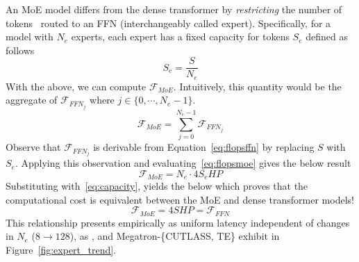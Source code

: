 An MoE model differs from the dense transformer by \emph{restricting} the number of
tokens~\cite{DBLP:conf/iclr/LepikhinLXCFHKS21, MLSYS2023_5a54f793} routed to an FFN
(interchangeably called expert).
Specifically, for a model with $N_e$ experts, each expert has a fixed capacity for tokens $S_e$ defined as follows
\begin{equation}\label{eq:capacity}
S_e = \frac{S}{N_e}
\end{equation}
With the above, we can compute $\mathcal{F}_{MoE}$.
Intuitively, this quantity would be the aggregate of $\mathcal{F}_{{FFN}_j}$ where $j \in \{0, \cdots, N_e - 1\}$.
\begin{equation}\label{eq:flopsmoe}
\mathcal{F}_{MoE} = \sum\limits_{j = 0}^{N_e - 1}\mathcal{F}_{{FFN}_j}
\end{equation}
Observe that $\mathcal{F}_{{FFN}_j}$ is derivable from Equation~\ref{eq:flopsffn}
by replacing $S$ with $S_e$.
Applying this observation and evaluating~\ref{eq:flopsmoe} gives the below result
\begin{equation}\label{eq:flopsmoe2}
\mathcal{F}_{MoE} = N_e \cdot 4S_{e}HP
\end{equation}
Substituting with~\ref{eq:capacity}, yields the below which proves that the computational cost is equivalent
between the MoE and dense transformer models!
\begin{equation}\label{eq:equivalence}
\mathcal{F}_{MoE} = 4SHP = \mathcal{F}_{FFN}
\end{equation}
This relationship presents empirically as uniform latency independent of changes in $N_e$ ($8 \rightarrow 128$),
as \sysname, and Megatron-\{CUTLASS, TE\} exhibit in Figure~\ref{fig:expert_trend}.
